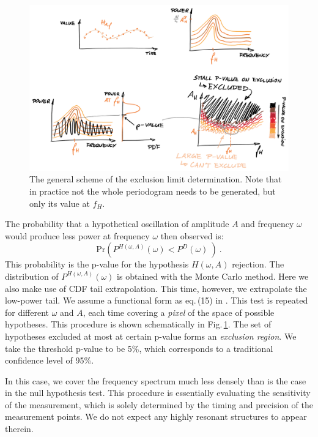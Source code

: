 \begin{figure}
  \centering \includegraphics[width=\linewidth]{gfx/axions/exclusion_region.png}
  \caption{The general scheme of the exclusion limit determination. Note that in practice not the whole periodogram needs to be generated, but only its value at $f_H$.}
  \label{fig:exclusion_region}
\end{figure}

The probability that a hypothetical oscillation of amplitude $A$ and frequency $\omega$ would produce less power at frequency $\omega$ then observed is:
\begin{equation}
  \mathrm{Pr}\left( P^{H(\omega, A)}(\omega) < P^D(\omega)\ \right) \ .
\end{equation}
This probability is the p-value for the hypothesis $H(\omega, A)$ rejection. The distribution of $P^{H(\omega, A)}(\omega)$ is obtained with the Monte Carlo method. Here we also make use of CDF tail extrapolation. This time, however, we extrapolate the low-power tail. We assume a functional form as eq.\,(15) in \cite{Scargle1982}. This test is repeated for different $\omega$ and $A$, each time covering a \emph{pixel} of the space of possible hypotheses. This procedure is shown schematically in Fig.\,\ref{fig:exclusion_region}. The set of hypotheses excluded at most at certain p-value forms an \emph{exclusion region}. We take the threshold p-value to be 5\%, which corresponds to a traditional confidence level of 95\%.

In this case, we cover the frequency spectrum much less densely than is the case in the null hypothesis test. This procedure is essentially evaluating the sensitivity of the measurement, which is solely determined by the timing and precision of the measurement points. We do not expect any highly resonant structures to appear therein.

